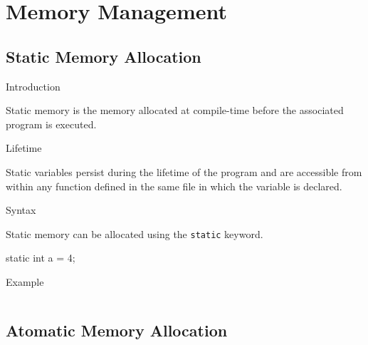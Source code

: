 \documentclass[compress]{beamer}
\begin{document}
\prepareCover

\section{Memory Management}

\subsection{Static Memory Allocation}

\begin{slide}
	\begin{block}{Introduction}

	Static memory is the memory allocated at compile-time before the associated program is executed.


	\end{block}
\end{slide}

\begin{slide}
	\begin{block}{Lifetime}

	Static variables persist during the lifetime of the program and are accessible from within any function defined in the same file in which the variable is declared.

	\end{block}
\end{slide}

\begin{slide}
	\begin{block}{Syntax}

	Static memory can be allocated using the \texttt{static} keyword.

	\begin{terminal}
	static int a = 4;
	\end{terminal}

	\end{block}
\end{slide}

\begin{slide}
	\begin{block}{Example}

	\inputminted[fontsize=\scriptsize, firstline=10, linenos]{c}{
		\resDirectory/static.c
	}

	\end{block}
\end{slide}

\subsection{Atomatic Memory Allocation}
\end{document}
